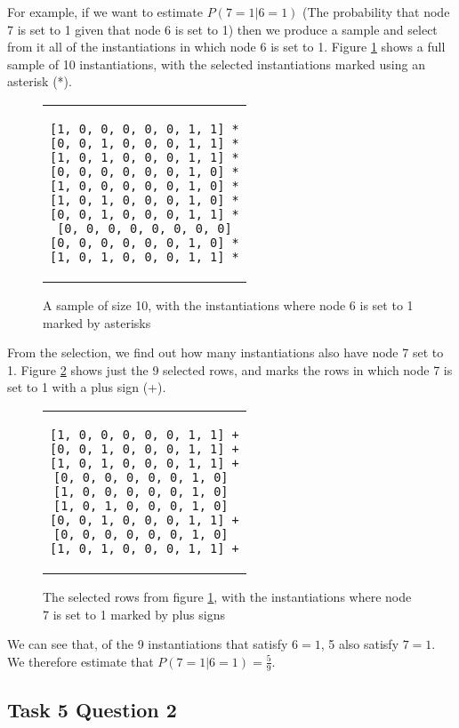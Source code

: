 \documentclass[a4paper,11pt]{article}
\begin{document}
For example, if we want to estimate $P(7=1|6=1)$ (The probability that node 7 is set to 1 given that node 6 is set to 1) then we produce a sample and select from it all of the instantiations in which node 6 is set to 1.  Figure \ref{sample1} shows a full sample of 10 instantiations, with the selected instantiations marked using an asterisk (*).

\begin{figure}[h]
	\centering
	\lstset{basicstyle=\ttfamily}
	\begin{tabular}{c}
	\begin{lstlisting}
[1, 0, 0, 0, 0, 0, 1, 1] *
[0, 0, 1, 0, 0, 0, 1, 1] *
[1, 0, 1, 0, 0, 0, 1, 1] *
[0, 0, 0, 0, 0, 0, 1, 0] *
[1, 0, 0, 0, 0, 0, 1, 0] *
[1, 0, 1, 0, 0, 0, 1, 0] *
[0, 0, 1, 0, 0, 0, 1, 1] *
[0, 0, 0, 0, 0, 0, 0, 0]
[0, 0, 0, 0, 0, 0, 1, 0] *
[1, 0, 1, 0, 0, 0, 1, 1] *
	\end{lstlisting}
	\end{tabular}
	\caption{A sample of size 10, with the instantiations where node 6 is set to 1 marked by asterisks}
	\label{sample1}
\end{figure}

From the selection, we find out how many instantiations also have node 7 set to 1. Figure \ref{sample2} shows just the 9 selected rows, and marks the rows in which node 7 is set to 1 with a plus sign (+).

\begin{figure}[h]
	\centering
	\lstset{basicstyle=\ttfamily}
	\begin{tabular}{c}
	\begin{lstlisting}
[1, 0, 0, 0, 0, 0, 1, 1] +
[0, 0, 1, 0, 0, 0, 1, 1] +
[1, 0, 1, 0, 0, 0, 1, 1] +
[0, 0, 0, 0, 0, 0, 1, 0] 
[1, 0, 0, 0, 0, 0, 1, 0] 
[1, 0, 1, 0, 0, 0, 1, 0] 
[0, 0, 1, 0, 0, 0, 1, 1] +
[0, 0, 0, 0, 0, 0, 1, 0] 
[1, 0, 1, 0, 0, 0, 1, 1] +
	\end{lstlisting}
	\end{tabular}
	\caption{The selected rows from figure \ref{sample1}, with the instantiations where node 7 is set to 1 marked by plus signs}
	\label{sample2}
\end{figure}

We can see that, of the 9 instantiations that satisfy $6=1$, 5 also satisfy $7=1$.  We therefore estimate that $P(7=1|6=1) = \frac{5}{9}$.

\subsection{Task 5 Question 2}
\end{document}
